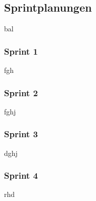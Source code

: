 \subsection{Sprintplanungen}
bal
\subsubsection{Sprint 1}
fgh
\subsubsection{Sprint 2}
fghj
\subsubsection{Sprint 3}
dghj
\subsubsection{Sprint 4}
rhd